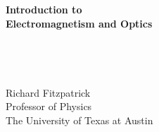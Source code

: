 \documentclass[12pt]{article}
\begin{document}
\thispagestyle{empty}
\begin{center}
{\Huge\bf Introduction to}\\[1ex]
{\Huge\bf Electromagnetism and Optics}\\[1ex]
~\\
~\\
~\\
~\\
{\Large \sf Richard Fitzpatrick}\\[1.5ex]
 {\Large\sf  Professor  of Physics}\\[1.5ex]
{\Large\sf  The University of Texas at Austin}
\end{center}
\tableofcontents
\pagestyle{fancy}
\cfoot{\thepage}

\large{














}
\end{document}
